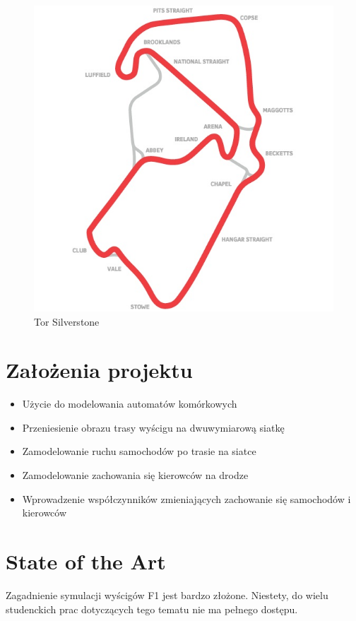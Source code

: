 \documentclass{article}
\begin{document}
\begin{figure}[h]
\begin{center}
\includegraphics[scale=0.4]{silv.jpg}
\caption{Tor Silverstone}
\end{center}
\end{figure}

\section{Założenia projektu}
\begin{itemize}
\item Użycie do modelowania automatów komórkowych
\item Przeniesienie obrazu trasy wyścigu na dwuwymiarową siatkę
\item Zamodelowanie ruchu samochodów po trasie na siatce
\item Zamodelowanie zachowania się kierowców na drodze
\item Wprowadzenie współczynników zmieniających zachowanie się samochodów i kierowców
\end{itemize}

\section{State of the Art}
Zagadnienie symulacji wyścigów F1 jest bardzo złożone. Niestety, do wielu studenckich prac dotyczących tego tematu nie ma pełnego dostępu.  \\
\end{document}
